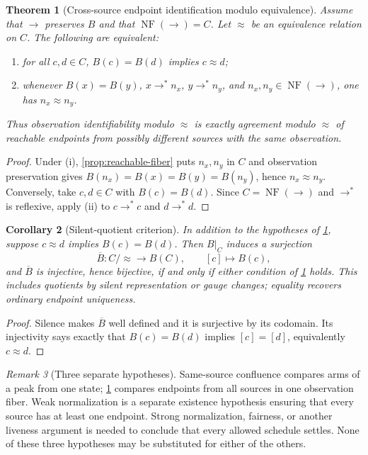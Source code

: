 \documentclass[11pt]{article}
\newtheorem{theorem}{Theorem}[section]
\newtheorem{corollary}[theorem]{Corollary}
\theoremstyle{definition}
\theoremstyle{remark}
\newtheorem{remark}[theorem]{Remark}
\numberwithin{equation}{section}
\newcommand{\NF}{\operatorname{NF}}
\begin{document}
\begin{theorem}[Cross-source endpoint identification modulo equivalence]
\label{thm:cross-source-modulo}
Assume that $\to$ preserves $B$ and that $\NF(\to)=C$.  Let $\approx$ be
an equivalence relation on $C$.  The following are equivalent:
\begin{enumerate}[label=(\roman*)]
\item for all $c,d\in C$, $B(c)=B(d)$ implies $c\approx d$;
\item whenever $B(x)=B(y)$, $x\to^*n_x$, $y\to^*n_y$, and
      $n_x,n_y\in\NF(\to)$, one has $n_x\approx n_y$.
\end{enumerate}
Thus observation identifiability modulo $\approx$ is exactly agreement modulo
$\approx$ of reachable endpoints from \emph{possibly different} sources with
the same observation.
\end{theorem}

\begin{proof}
Under (i), \cref{prop:reachable-fiber} puts $n_x,n_y$ in $C$ and observation
preservation gives $B(n_x)=B(x)=B(y)=B(n_y)$, hence $n_x\approx n_y$.
Conversely, take $c,d\in C$ with $B(c)=B(d)$.  Since $C=\NF(\to)$ and
$\to^*$ is reflexive, apply (ii) to $c\to^*c$ and $d\to^*d$.
\end{proof}

\begin{corollary}[Silent-quotient criterion]\label{cor:silent-quotient}
In addition to the hypotheses of \cref{thm:cross-source-modulo}, suppose
$c\approx d$ implies $B(c)=B(d)$.  Then $B|_C$ induces a surjection
\[
 \overline B:C/{\approx}\longrightarrow B(C),\qquad [c]\longmapsto B(c),
\]
and $\overline B$ is injective, hence bijective, if and only if either
condition of \cref{thm:cross-source-modulo} holds.  This includes quotients by
silent representation or gauge changes; equality recovers ordinary endpoint
uniqueness.
\end{corollary}

\begin{proof}
Silence makes $\overline B$ well defined and it is surjective by its
codomain.  Its injectivity says exactly that $B(c)=B(d)$ implies
$[c]=[d]$, equivalently $c\approx d$.
\end{proof}

\begin{remark}[Three separate hypotheses]
Same-source confluence compares arms of a peak from one state;
\cref{thm:cross-source-modulo} compares endpoints from all sources in one
observation fiber.  Weak normalization is a separate existence hypothesis
ensuring that every source has at least one endpoint.  Strong normalization,
fairness, or another liveness argument is needed to conclude that every
allowed schedule settles.  None of these three hypotheses may be substituted
for either of the others.
\end{remark}
\end{document}

